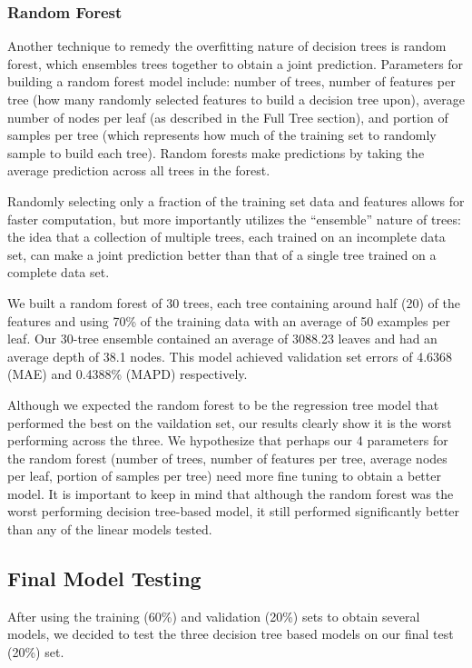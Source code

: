 \documentclass[12pt, fleqn]{article}
\begin{document}
\subsubsection{Random Forest}
	Another technique to remedy the overfitting nature of decision trees is random forest, which ensembles trees together to obtain a joint prediction. Parameters for building a random forest model include: number of trees, number of features per tree (how many randomly selected features to build a decision tree upon), average number of nodes per leaf (as described in the Full Tree section), and portion of samples per tree (which represents how much of the training set to randomly sample to build each tree). Random forests make predictions by taking the average prediction across all trees in the forest.

	Randomly selecting only a fraction of the training set data and features allows for faster computation, but more importantly utilizes the ``ensemble'' nature of trees: the idea that a collection of multiple trees, each trained on an incomplete data set, can make a joint prediction better than that of a single tree trained on a complete data set. 

	We built a random forest of 30 trees, each tree containing around half (20) of the features and using 70\% of the training data with an average of 50 examples per leaf. Our 30-tree ensemble contained an average of 3088.23 leaves and had an average depth of 38.1 nodes. This model achieved validation set errors of 4.6368 (MAE) and 0.4388\% (MAPD) respectively.

	Although we expected the random forest to be the regression tree model that performed the best on the vaildation set, our results clearly show it is the worst performing across the three. We hypothesize that perhaps our 4 parameters for the random forest (number of trees, number of features per tree, average nodes per leaf, portion of samples per tree) need more fine tuning to obtain a better model. It is important to keep in mind that although the random forest was the worst performing decision tree-based model, it still performed significantly better than any of the linear models tested.


\subsection{Final Model Testing}
After using the training (60\%) and validation (20\%) sets to obtain several models, we decided to test the three decision tree based models on our final test (20\%) set. 
\end{document}
